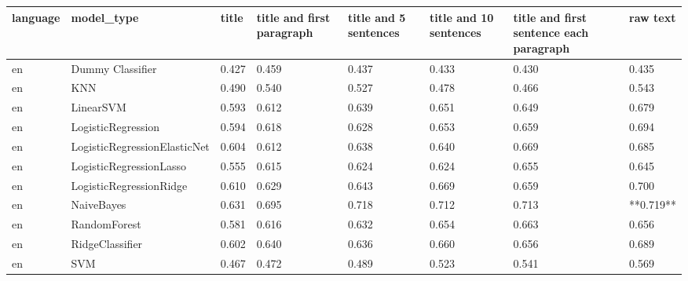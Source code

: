 \begin{tabular}{llllllll}
\toprule
language &                   model\_type & title & title and first paragraph & title and 5 sentences & title and 10 sentences & title and first sentence each paragraph &  raw text \\
\midrule
      en &             Dummy Classifier & 0.427 &                     0.459 &                 0.437 &                  0.433 &                                   0.430 &     0.435 \\
      en &                          KNN & 0.490 &                     0.540 &                 0.527 &                  0.478 &                                   0.466 &     0.543 \\
      en &                    LinearSVM & 0.593 &                     0.612 &                 0.639 &                  0.651 &                                   0.649 &     0.679 \\
      en &           LogisticRegression & 0.594 &                     0.618 &                 0.628 &                  0.653 &                                   0.659 &     0.694 \\
      en & LogisticRegressionElasticNet & 0.604 &                     0.612 &                 0.638 &                  0.640 &                                   0.669 &     0.685 \\
      en &      LogisticRegressionLasso & 0.555 &                     0.615 &                 0.624 &                  0.624 &                                   0.655 &     0.645 \\
      en &      LogisticRegressionRidge & 0.610 &                     0.629 &                 0.643 &                  0.669 &                                   0.659 &     0.700 \\
      en &                   NaiveBayes & 0.631 &                     0.695 &                 0.718 &                  0.712 &                                   0.713 & **0.719** \\
      en &                 RandomForest & 0.581 &                     0.616 &                 0.632 &                  0.654 &                                   0.663 &     0.656 \\
      en &              RidgeClassifier & 0.602 &                     0.640 &                 0.636 &                  0.660 &                                   0.656 &     0.689 \\
      en &                          SVM & 0.467 &                     0.472 &                 0.489 &                  0.523 &                                   0.541 &     0.569 \\

\end{tabular}

